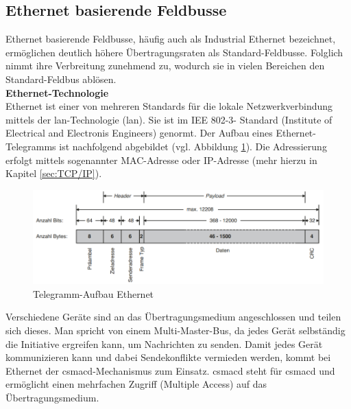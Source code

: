 \documentclass[ a4paper,
                oneside,
                toc=bibliography,
                toc=listof
                ]{scrbook}
\begin{document}
	\subsection{Ethernet basierende Feldbusse}
	\label{subsec:EthernetFeldbus}
	Ethernet basierende Feldbusse, häufig auch als \glqq Industrial Ethernet\grqq{} bezeichnet, ermöglichen deutlich höhere Übertragungsraten als Standard-Feldbusse. Folglich nimmt ihre Verbreitung zunehmend zu, wodurch sie in vielen Bereichen den Standard-Feldbus ablösen. \cite{hering2012elektrotechnik} \vspace{0.5\baselineskip}\\
	\textbf{Ethernet-Technologie}\\
	Ethernet ist einer von mehreren Standards für die lokale Netzwerkverbindung mittels der \acs{lan}-Technologie (\acl{lan}). Sie ist im IEE 802-3- Standard (Institute of Electrical and Electronis Engineers) genormt. Der Aufbau eines Ethernet-Telegramms ist nachfolgend abgebildet (vgl. Abbildung \ref{fig:EthernetTelegramm}). Die Adressierung erfolgt mittels sogenannter MAC-Adresse oder IP-Adresse (mehr hierzu in Kapitel \ref{sec:TCP/IP}).  \cite{riggert2002rechnernetze}\\ \clearpage
	\begin{figure}[!h]
		\centering
		\includegraphics[width=1.0\linewidth]{./images/Ethernet-Telegram.png}
		\caption{Telegramm-Aufbau Ethernet \cite{hering2012elektrotechnik}}
		\label{fig:EthernetTelegramm}
	\end{figure}
	\noindent
	Verschiedene Geräte sind an das Übertragungsmedium angeschlossen und teilen sich dieses. Man spricht von einem Multi-Master-Bus, da jedes Gerät selbständig die Initiative ergreifen kann, um Nachrichten zu senden. Damit jedes Gerät kommunizieren kann und dabei Sendekonflikte vermieden werden, kommt bei Ethernet der \acs{csmacd}-Mechanismus zum Einsatz. \acs{csmacd} steht für \glqq \acl{csmacd}\grqq{} und ermöglicht einen mehrfachen Zugriff (Multiple Access) auf das Übertragungsmedium. \cite{hering2012elektrotechnik} \cite{riggert2002rechnernetze}
\end{document}
